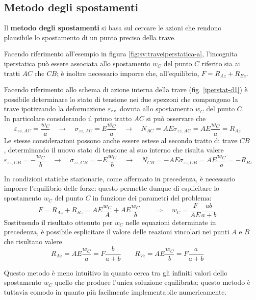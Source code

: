 	\subsection{Metodo degli spostamenti}
		\begin{concetto}
			Il \textbf{metodo degli spostamenti} si basa sul cercare le azioni che rendono plausibile lo spostamento di un punto preciso della trave.
		\end{concetto}
		Facendo riferimento all'esempio in figura \ref{fig:sv:traveiperstatica-a}, l'incognita iperstatica può essere associata allo spostamento $w_C$ del punto $C$ riferito sia ai tratti $AC$ che $CB$; è inoltre necessario imporre che, all'equilibrio, $F= R_{Az} + R_{Bz}$.
		
		Facendo riferimento allo schema di azione interna della trave (fig. \ref{iperstat-d1}) è possibile determinare lo stato di tensione nei due spezzoni che compongono la trave ipotizzando la deformazione $\varepsilon_{zz}$ dovuta allo spostamento $w_C$ del punto $C$. In particolare considerando il primo tratto $AC$ si può osservare che
		\[ \varepsilon_{zz,AC} = \frac {w_C} a \quad \rightarrow \quad \sigma_{zz,AC} = E \frac {w_C}a \quad \rightarrow \quad N_{AC} = AE \sigma_{zz,AC} =AE\frac{w_C}a = R_{Az}   \]  
		Le stesse considerazioni possono anche essere estese al secondo tratto di trave $CB$, determinando il nuovo stato di tensione al suo interno che risulta valere
		\[ \varepsilon_{zz,CB} = -\frac {w_C} b \quad \rightarrow \quad \sigma_{zz,CB} = -E \frac {w_C}b \quad \rightarrow \quad N_{CB} = -AE \sigma_{zz,CB} =AE\frac{w_C}a = -R_{Bz}   \]  
		
		In condizioni statiche stazionarie, come affermato in precedenza, è necessario imporre l'equilibrio delle forze: questo permette dunque di esplicitare lo spostamento $w_C$ del punto $C$ in funzione dei parametri del problema:
		\[ F = R_{Az} + R_{Bz} = AE \frac{w_C}{A} + AE \frac{w_C}{b} \qquad \Rightarrow \quad w_C = \frac F{AE} \frac{ab}{a+b} \]
		Sostituendo il risultato ottenuto per $w_C$ nelle equazioni determinate in precedenza, è possibile esplicitare il valore delle reazioni vincolari nei punti $A$ e $B$ che risultano valere
		\[ R_{Az} = AE\frac{w_C}{a} = F \frac{b}{a+b} \qquad R_{Vz} = AE\frac{w_C}{b} = F \frac{a}{a+b} \]
		
		\begin{osservazione}
			Questo metodo è meno intuitivo in quanto cerca tra gli infiniti valori dello spostamento $w_C$ quello che produce l'unica soluzione equilibrata; questo metodo è tuttavia comodo in quanto più facilmente implementabile numericamente.
		\end{osservazione}

